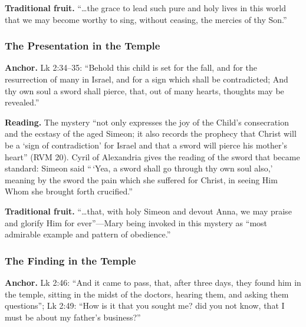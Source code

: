 \textbf{Traditional fruit.} ``\ldots the grace to lead such pure and
holy lives in this world that we may become worthy to sing, without
ceasing, the mercies of thy Son.''

\subsubsection{The Presentation in the Temple}

\textbf{Anchor.} Lk 2:34--35: ``Behold this child is set for the fall,
and for the resurrection of many in Israel, and for a sign which shall
be contradicted; And thy own soul a sword shall pierce, that, out of
many hearts, thoughts may be revealed.''

\textbf{Reading.} The mystery ``not only expresses the joy of the
Child's consecration and the ecstasy of the aged Simeon; it also records
the prophecy that Christ will be a `sign of contradiction' for Israel and
that a sword will pierce his mother's heart'' (RVM 20). Cyril of
Alexandria gives the reading of the sword that became standard: Simeon
said ``\,`Yea, a sword shall go through thy own soul also,' meaning by
the sword the pain which she suffered for Christ, in seeing Him Whom she
brought forth crucified.''

\textbf{Traditional fruit.} ``\ldots that, with holy Simeon and devout
Anna, we may praise and glorify Him for ever''---Mary being invoked in
this mystery as ``most admirable example and pattern of obedience.''

\subsubsection{The Finding in the Temple}

\textbf{Anchor.} Lk 2:46: ``And it came to pass, that, after three days,
they found him in the temple, sitting in the midst of the doctors,
hearing them, and asking them questions''; Lk 2:49: ``How is it that you
sought me? did you not know, that I must be about my father's
business?''


